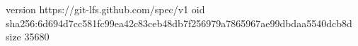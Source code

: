 version https://git-lfs.github.com/spec/v1
oid sha256:6d694d7cc581fc99ea42c83ceb48db7f256979a7865967ae99dbdaa5540dcb8d
size 35680
